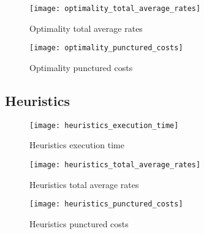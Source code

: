 \begin{frame}
  \begin{figure}
    \texttt{[image: optimality\_total\_average\_rates]}
    \caption{Optimality total average rates}
  \end{figure}
\end{frame}

\begin{frame}
  \begin{figure}
    \texttt{[image: optimality\_punctured\_costs]}
    \caption{Optimality punctured costs}
  \end{figure}
\end{frame}

\subsection{Heuristics}
\begin{frame}
  \begin{figure}
    \texttt{[image: heuristics\_execution\_time]}
    \caption{Heuristics execution time}
  \end{figure}
\end{frame}

\begin{frame}
  \begin{figure}
    \texttt{[image: heuristics\_total\_average\_rates]}
    \caption{Heuristics total average rates}
  \end{figure}
\end{frame}

\begin{frame}
  \begin{figure}
    \texttt{[image: heuristics\_punctured\_costs]}
    \caption{Heuristics punctured costs}
  \end{figure}
\end{frame}
